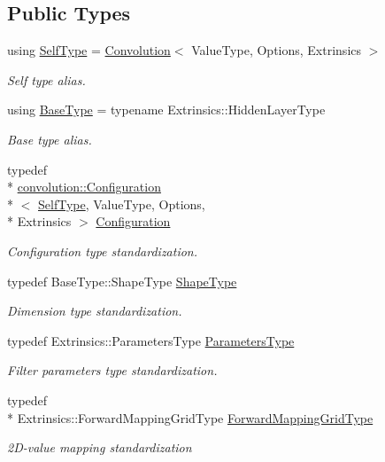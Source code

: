 \subsection*{Public Types}
\begin{DoxyCompactItemize}
\item 
using \hyperlink{classffnn_1_1layer_1_1_convolution_ac3985357df433360d75f39353faae600}{Self\-Type} = \hyperlink{classffnn_1_1layer_1_1_convolution}{Convolution}$<$ Value\-Type, Options, Extrinsics $>$
\begin{DoxyCompactList}\small\item\em Self type alias. \end{DoxyCompactList}\item 
using \hyperlink{classffnn_1_1layer_1_1_convolution_a30a3026202f29a601e539c80824fcf1f}{Base\-Type} = typename Extrinsics\-::\-Hidden\-Layer\-Type
\begin{DoxyCompactList}\small\item\em Base type alias. \end{DoxyCompactList}\item 
typedef \\*
\hyperlink{classffnn_1_1layer_1_1convolution_1_1_configuration}{convolution\-::\-Configuration}\\*
$<$ \hyperlink{classffnn_1_1layer_1_1_convolution_ac3985357df433360d75f39353faae600}{Self\-Type}, Value\-Type, Options, \\*
Extrinsics $>$ \hyperlink{classffnn_1_1layer_1_1_convolution_a01dee52138bb0d51a1ecddb5504176be}{Configuration}
\begin{DoxyCompactList}\small\item\em Configuration type standardization. \end{DoxyCompactList}\item 
typedef Base\-Type\-::\-Shape\-Type \hyperlink{classffnn_1_1layer_1_1_convolution_ab76070ee3cc7b42325f46bc3bc86bf5f}{Shape\-Type}
\begin{DoxyCompactList}\small\item\em Dimension type standardization. \end{DoxyCompactList}\item 
typedef Extrinsics\-::\-Parameters\-Type \hyperlink{classffnn_1_1layer_1_1_convolution_af2568040fc4089f93a6483da08dcc266}{Parameters\-Type}
\begin{DoxyCompactList}\small\item\em Filter parameters type standardization. \end{DoxyCompactList}\item 
typedef \\*
Extrinsics\-::\-Forward\-Mapping\-Grid\-Type \hyperlink{classffnn_1_1layer_1_1_convolution_a2b15b4e46b7679753e4f3e28b619bae5}{Forward\-Mapping\-Grid\-Type}
\begin{DoxyCompactList}\small\item\em 2\-D-\/value mapping standardization \end{DoxyCompactList}\end{DoxyCompactItemize}
